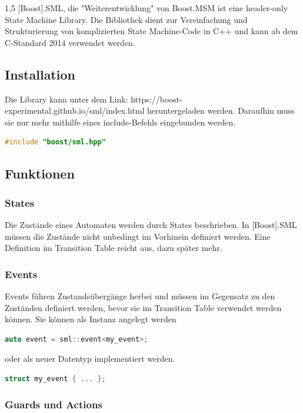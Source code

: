 \documentclass[a4paper]{article}
\begin{document}
\begin{spacing}{1,5}
[Boost].SML, die "Weiterentwicklung" von Boost.MSM ist eine header-only State Machine Library. Die Bibliothek dient zur Vereinfachung und Strukturierung von komplizierten State Machine-Code in C++ und kann ab dem C-Standard 2014 verwendet werden.

\subsection{Installation}

Die Library kann unter dem Link: https://boost-experimental.github.io/sml/index.html heruntergeladen werden. Daraufhin muss sie nur mehr mithilfe eines include-Befehls eingebunden werden.
\begin{lstlisting}[language=c++]
#include "boost/sml.hpp"
\end{lstlisting}

\subsection{Funktionen}

\subsubsection{States}

Die Zustände eines Automaten werden durch States beschrieben. In [Boost].SML müssen die Zustände nicht unbedingt im Vorhinein definiert werden. Eine Definition im Transition Table reicht aus, dazu später mehr.

\subsubsection{Events}

Events führen Zustandsübergänge herbei und müssen im Gegensatz zu den Zuständen definiert werden, bevor sie im Transition Table verwendet werden können. Sie können als Instanz angelegt werden \begin{lstlisting}[language=c++]
auto event = sml::event<my_event>;
\end{lstlisting} oder als neuer Datentyp implementiert werden.
\begin{lstlisting}[language=c++]
struct my_event { ... };
\end{lstlisting}

\newpage

\subsubsection{Guards und Actions}


\end{spacing}
\end{document}
